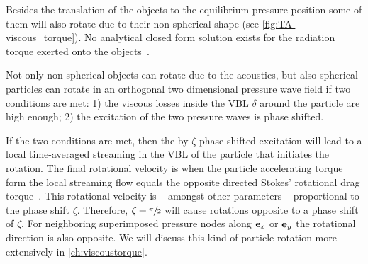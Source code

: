 Besides the translation of the objects to the equilibrium pressure position 
some of them will also rotate due to their non-spherical shape (see 
\cref{fig:TA-viscous_torque}). No analytical closed form solution exists for 
the radiation torque exerted onto the objects~\cite{Lamprecht2017}.


Not only non-spherical objects can rotate due to the acoustics, but also 
spherical particles can rotate in an orthogonal two dimensional pressure wave 
field if two conditions are met: 1) the viscous losses inside the VBL $\delta$ 
around the particle are high enough; 2) the excitation of the two pressure 
waves is phase shifted.

If the two conditions are met, then the by $\zeta$ phase shifted excitation 
will lead to a local time-averaged streaming in the VBL of the particle that 
initiates the rotation. The final rotational velocity is when the particle 
accelerating torque form the local streaming flow equals the opposite directed 
Stokes' rotational drag torque~\cite{Lamprecht2017}. This rotational velocity 
is -- amongst other parameters -- proportional to the phase shift $\zeta$. 
Therefore, $\zeta + \sfrac{\pi}{2}$ will cause rotations opposite to a phase 
shift of $\zeta$. For neighboring superimposed pressure nodes along $\vb{e}_{x}$ or 
$\vb{e}_{y}$ the rotational direction is also opposite. We will discuss this kind of 
particle rotation more extensively in \cref{ch:viscoustorque}.

